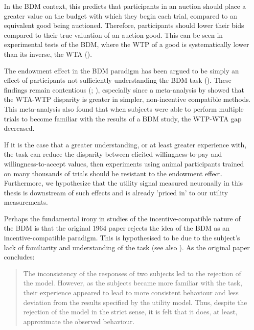 In the BDM context, this predicts that participants in an auction should place a greater value on the budget with which they begin each trial, compared to an equivalent good being auctioned. Therefore, participants should lower their bids compared to their true valuation of an auction good. This can be seen in experimental tests of the BDM, where the WTP of a good is systematically lower than its inverse, the WTA (\cite{yechiamWhosBiasedMetaanalysis2017}).

The endowment effect in the BDM paradigm has been argued to be simply an effect of participants not sufficiently understanding the BDM task (\cite{plottWillingnessPayWillingness2005}). These findings remain contentious (\cite{isoniWillingnessPayWillingness2011}; \cite{plottWillingnessPayWillingness2011}), especially since a meta-analysis by \cite{tuncelNewMetaanalysisWTP2014} showed that the WTA-WTP disparity is greater in simpler, non-incentive compatible methods. This meta-analysis also found that when subjects were able to perform multiple trials to become familiar with the results of a BDM study, the WTP-WTA gap decreased.

If it is the case that a greater understanding, or at least greater experience with, the task can reduce the disparity between elicited willingness-to-pay and willingness-to-accept values, then experiments using animal participants trained on many thousands of trials should be resistant to the endowment effect. Furthermore, we hypothesize that the utility signal measured neuronally in this thesis is downstream of such effects and is already 'priced in' to our utility measurements.

Perhaps the fundamental irony in studies of the incentive-compatible nature of the BDM is that the original 1964 paper rejects the idea of the BDM as an incentive-compatible paradigm. This is hypothesised to be due to the subject’s lack of familiarity and understanding of the task (see also \cite{casonMisconceptionsGameForm2014}). As the original paper concludes:

\begin{quote}
The inconsistency of the responses of two subjects led to the rejection of the model. However, as the subjects became more familiar with the task, their experience appeared to lead to more consistent behaviour and less deviation from the results specified by the utility model. Thus, despite the rejection of the model in the strict sense, it is felt that it does, at least, approximate the observed behaviour.

\end{quote}

